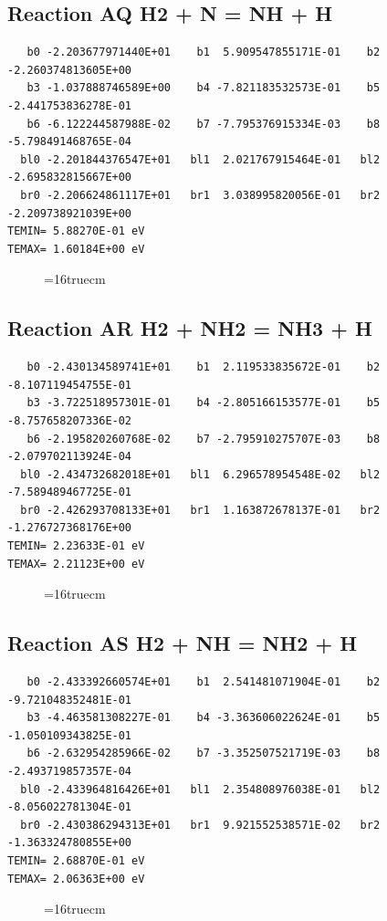\documentclass[12pt,dvipdfm]{article}
\begin{document}
\subsection{
Reaction AQ H2 + N = NH + H}
\begin{small}\begin{verbatim}
   b0 -2.203677971440E+01    b1  5.909547855171E-01    b2 -2.260374813605E+00
   b3 -1.037888746589E+00    b4 -7.821183532573E-01    b5 -2.441753836278E-01
   b6 -6.122244587988E-02    b7 -7.795376915334E-03    b8 -5.798491468765E-04
  bl0 -2.201844376547E+01   bl1  2.021767915464E-01   bl2 -2.695832815667E+00
  br0 -2.206624861117E+01   br1  3.038995820056E-01   br2 -2.209738921039E+00
TEMIN= 5.88270E-01 eV
TEMAX= 1.60184E+00 eV
   \end{verbatim}\end{small}
\begin{figure}[h!]
\label{n2rates}
\epsfxsize=16truecm
\end{figure}
\newpage

\subsection{
Reaction AR H2 + NH2 = NH3 + H}
\begin{small}\begin{verbatim}
   b0 -2.430134589741E+01    b1  2.119533835672E-01    b2 -8.107119454755E-01
   b3 -3.722518957301E-01    b4 -2.805166153577E-01    b5 -8.757658207336E-02
   b6 -2.195820260768E-02    b7 -2.795910275707E-03    b8 -2.079702113924E-04
  bl0 -2.434732682018E+01   bl1  6.296578954548E-02   bl2 -7.589489467725E-01
  br0 -2.426293708133E+01   br1  1.163872678137E-01   br2 -1.276727368176E+00
TEMIN= 2.23633E-01 eV
TEMAX= 2.21123E+00 eV
   \end{verbatim}\end{small}
\begin{figure}[h!]
\label{n2rates}
\epsfxsize=16truecm
\end{figure}
\newpage

\subsection{
Reaction AS H2 + NH = NH2 + H}
\begin{small}\begin{verbatim}
   b0 -2.433392660574E+01    b1  2.541481071904E-01    b2 -9.721048352481E-01
   b3 -4.463581308227E-01    b4 -3.363606022624E-01    b5 -1.050109343825E-01
   b6 -2.632954285966E-02    b7 -3.352507521719E-03    b8 -2.493719857357E-04
  bl0 -2.433964816426E+01   bl1  2.354808976038E-01   bl2 -8.056022781304E-01
  br0 -2.430386294313E+01   br1  9.921552538571E-02   br2 -1.363324780855E+00
TEMIN= 2.68870E-01 eV
TEMAX= 2.06363E+00 eV
   \end{verbatim}\end{small}
\begin{figure}[h!]
\label{n2rates}
\epsfxsize=16truecm
\end{figure}
\newpage
\end{document}
